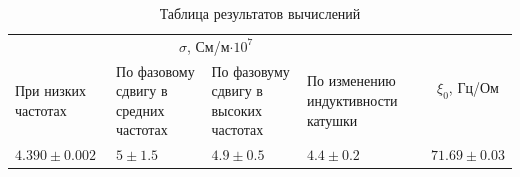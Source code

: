 \begin{table}[h!]
    \centering
    \begin{tabular}{|p{3cm}|p{3.8cm}|p{4.2cm}|p{4cm}|c|}
        \hline
        \multicolumn{4}{|c|}{$\sigma$, См/м$\cdot 10^7$} & \multirow{2}{*}{$\xi_0$, Гц/Ом} \\
        При низких частотах & По фазовому сдвигу в средних частотах &  По фазовуму сдвигу в высоких частотах & По изменению индуктивности катушки & \\\hline
        $4.390\pm0.002$ & $5\pm1.5$ & $4.9\pm0.5$ & $4.4\pm0.2$ & $71.69\pm0.03$\\\hline
    \end{tabular}
    \caption{Таблица результатов вычислений}
\end{table}



